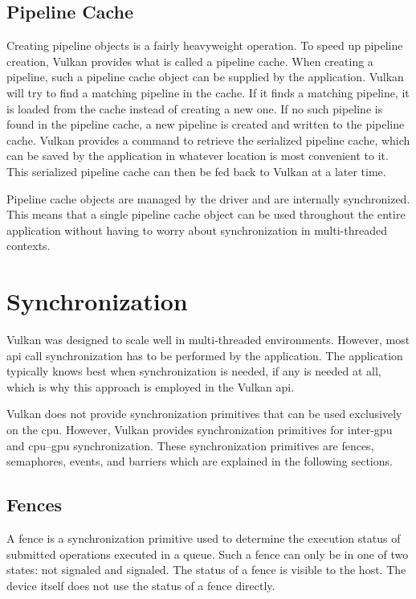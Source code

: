     \subsection{Pipeline Cache}
    \label{subsec:PipelineCache}
      Creating pipeline objects is a fairly heavyweight operation.
      To speed up pipeline creation, Vulkan provides what is called a pipeline cache.
      When creating a pipeline, such a pipeline cache object can be supplied by the application.
      Vulkan will try to find a matching pipeline in the cache.
      If it finds a matching pipeline, it is loaded from the cache instead of creating a new one.
      If no such pipeline is found in the pipeline cache, a new pipeline is created and written to the pipeline cache.
      Vulkan provides a command to retrieve the serialized pipeline cache, which can be saved by the application in whatever location is most convenient to it.
      This serialized pipeline cache can then be fed back to Vulkan at a later time.

      Pipeline cache objects are managed by the \gls{driver} and are internally synchronized.
      This means that a single pipeline cache object can be used throughout the entire application without having to worry about synchronization in multi-threaded contexts.


  \section{Synchronization}
    Vulkan was designed to scale well in multi-threaded environments.
    However, most \gls{api} call synchronization has to be performed by the application.
    The application typically knows best when synchronization is needed, if any is needed at all, which is why this approach is employed in the Vulkan \gls{api}.

    Vulkan does not provide synchronization primitives that can be used exclusively on the \gls{cpu}.
    However, Vulkan provides synchronization primitives for inter-\gls{gpu} and \gls{cpu}--\gls{gpu} synchronization.
    These synchronization primitives are fences, semaphores, events, and barriers which are explained in the following sections.

    \subsection{Fences}
    \label{sub:Fences}
      A fence is a synchronization primitive used to determine the execution status of submitted operations executed in a queue.
      Such a fence can only be in one of two states: not signaled and signaled.
      The status of a fence is visible to the host.
      The device itself does not use the status of a fence directly.

